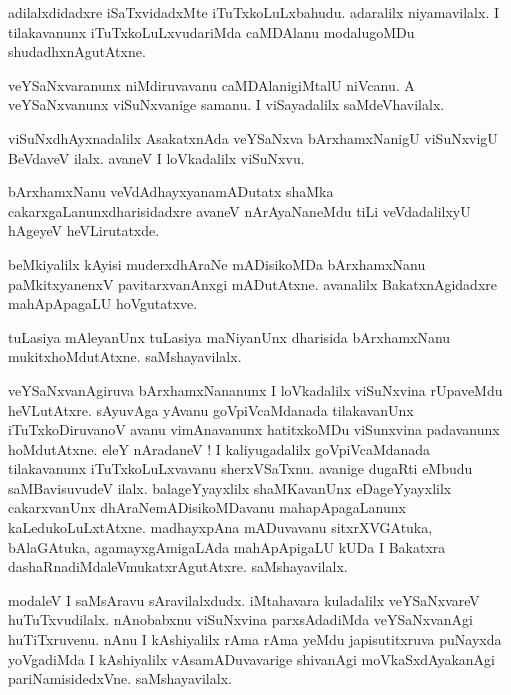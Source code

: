 \documentclass{article}
\begin{document}
\begin{mn}%
adilalxdidadxre iSaTxvidadxMte iTuTxkoLuLxbahudu. adaralilx niyamavilalx. I tilakavanunx 
iTuTxkoLuLxvudariMda caMDAlanu modalugoMDu shudadhxnAgutAtxne.
\end{mn}

\begin{mn}%
veYSaNxvaranunx niMdiruvavanu caMDAlanigiMtalU niVcanu. A veYSaNxvanunx viSuNxvanige samanu. I 
viSayadalilx saMdeVhavilalx.
\end{mn}

\begin{mn}%
viSuNxdhAyxnadalilx AsakatxnAda veYSaNxva bArxhamxNanigU viSuNxvigU BeVdaveV ilalx. avaneV I 
loVkadalilx viSuNxvu.
\end{mn}

\begin{mn}%
bArxhamxNanu veVdAdhayxyanamADutatx shaMka cakarxgaLanunxdharisidadxre avaneV nArAyaNaneMdu tiLi 
veVdadalilxyU hAgeyeV heVLirutatxde.
\end{mn}

\begin{mn}%
beMkiyalilx kAyisi muderxdhAraNe mADisikoMDa bArxhamxNanu paMkitxyanenxV pavitarxvanAnxgi 
mADutAtxne. avanalilx BakatxnAgidadxre mahApApagaLU hoVgutatxve.
\end{mn}

\begin{mn}%
tuLasiya mAleyanUnx tuLasiya maNiyanUnx dharisida bArxhamxNanu mukitxhoMdutAtxne. saMshayavilalx.
\end{mn}

\begin{mn}%
veYSaNxvanAgiruva bArxhamxNananunx I loVkadalilx viSuNxvina rUpaveMdu heVLutAtxre. sAyuvAga yAvanu 
goVpiVcaMdanada tilakavanUnx iTuTxkoDiruvanoV avanu vimAnavanunx hatitxkoMDu viSunxvina 
padavanunx hoMdutAtxne. eleY nAradaneV ! I kaliyugadalilx goVpiVcaMdanada tilakavanunx 
iTuTxkoLuLxvavanu sherxVSaTxnu. avanige dugaRti eMbudu saMBavisuvudeV ilalx. balageYyayxlilx 
shaMKavanUnx eDageYyayxlilx  cakarxvanUnx dhAraNemADisikoMDavanu mahapApagaLanunx 
kaLedukoLuLxtAtxne. madhayxpAna mADuvavanu sitxrXVGAtuka, bAlaGAtuka, agamayxgAmigaLAda 
mahApApigaLU kUDa I Bakatxra dashaRnadiMdaleVmukatxrAgutAtxre. saMshayavilalx.
\end{mn}

\begin{mn}%
modaleV I saMsAravu sAravilalxdudx. iMtahavara kuladalilx veYSaNxvareV huTuTxvudilalx. nAnobabxnu 
viSuNxvina parxsAdadiMda veYSaNxvanAgi huTiTxruvenu. nAnu I kAshiyalilx rAma rAma yeMdu 
japisutitxruva puNayxda yoVgadiMda I kAshiyalilx vAsamADuvavarige shivanAgi moVkaSxdAyakanAgi 
pariNamisidedxVne. saMshayavilalx.
\end{mn}
\end{document}

